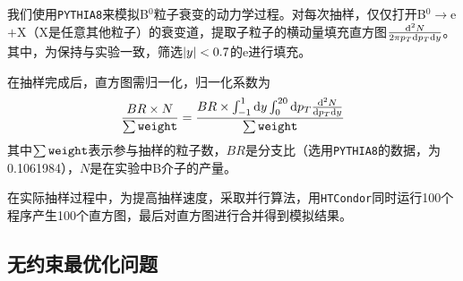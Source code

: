 \documentclass[12pt, a4paper]{ctexart}
\begin{document}
我们使用\texttt{PYTHIA8}\cite{Sj_strand_2015}来模拟B$^0$粒子衰变的动力学过程。对每次抽样，仅仅打开B$^0\to$e$+$X（X是任意其他粒子）的衰变道，提取子粒子的横动量填充直方图$\frac{\mathrm{d} ^2N}{2\pi p_T\mathrm{d} p_T\mathrm{d} y}$。其中，为保持与实验一致，筛选$\abs{y}<0.7$的e进行填充。

在抽样完成后，直方图需归一化，归一化系数为
\begin{equation}
	\frac{BR\times N}{\sum\text{\texttt{weight}}} = \frac{BR\times\int_{-1}^1\mathrm{d} y\int_0^{20}\mathrm{d} p_T\frac{\mathrm{d} ^2N}{\mathrm{d} p_T\mathrm{d} y}}{\sum\text{\texttt{weight}}}
\end{equation}
其中$\sum\text{\texttt{weight}}$表示参与抽样的粒子数，$BR$是分支比（选用\texttt{PYTHIA8}的数据，为\num{0.1061984}），$N$是在实验中B介子的产量。

在实际抽样过程中，为提高抽样速度，采取并行算法，用\texttt{HTCondor}同时运行100个程序产生100个直方图，最后对直方图进行合并得到模拟结果。



\subsection{无约束最优化问题} %
\label{sub:无约束最优化问题}
\end{document}
